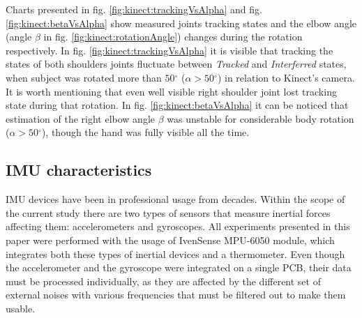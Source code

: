 \documentclass[sensors,article,submit,moreauthors,pdftex,10pt,a4paper]{mdpi}
\newcommand{\degree}{\ensuremath{{}^{\circ}}\xspace}
\begin{document}
Charts presented in fig. \ref{fig:kinect:trackingVsAlpha} and fig. \ref{fig:kinect:betaVsAlpha} show measured joints tracking states and the elbow angle (angle $\beta$ in fig. \ref{fig:kinect:rotationAngle}) changes during the rotation respectively. In fig. \ref{fig:kinect:trackingVsAlpha} it is visible that tracking the states of both shoulders joints fluctuate between \emph{Tracked} and \emph{Interferred} states, when subject was rotated more than $50\degree$ ($\alpha > 50\degree$) in relation to Kinect’s camera. It is worth mentioning that even well visible right shoulder joint lost tracking state during that rotation. In fig. \ref{fig:kinect:betaVsAlpha} it can be noticed that estimation of the right elbow angle $\beta$ was unstable for considerable body rotation ($\alpha > 50\degree$), though the hand was fully visible all the time.

\subsection{IMU characteristics}
IMU devices have been in professional usage from decades. Within the scope of the current study there are two types of sensors that measure inertial forces affecting them: accelerometers and gyroscopes. All experiments presented in this paper were performed with the usage of IvenSense MPU-6050 module, which integrates both these types of inertial devices and a thermometer. Even though the accelerometer and the gyroscope were integrated on a single PCB, their data must be processed individually, as they are affected by the different set of external noises with various frequencies that must be filtered out to make them usable.
\end{document}
